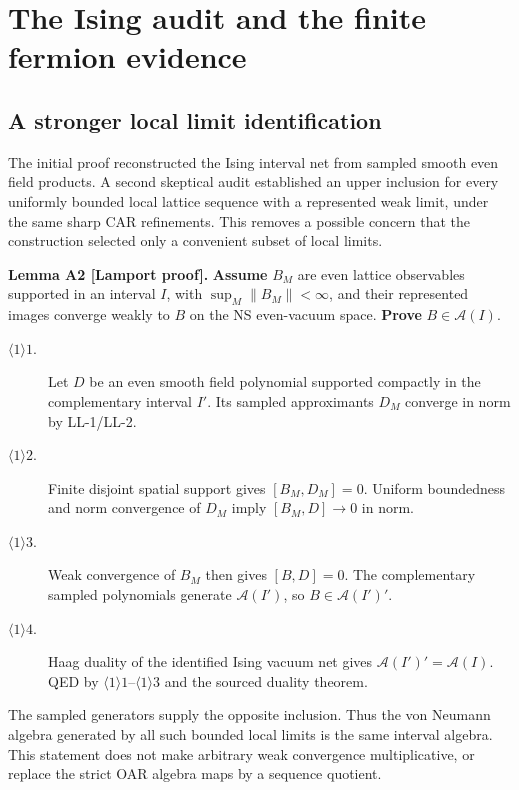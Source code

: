 \section{The Ising audit and the finite fermion evidence}

\subsection{A stronger local limit identification}

The initial proof reconstructed the Ising interval net from sampled smooth
even field products. A second skeptical audit established an upper inclusion
for every uniformly bounded local lattice sequence with a represented weak
limit, under the same sharp CAR refinements. This removes a possible concern
that the construction selected only a convenient subset of local limits.

\textbf{Lemma A2 [Lamport proof].}
\textbf{Assume} $B_M$ are even lattice observables supported in an interval
$I$, with $\sup_M\|B_M\|<\infty$, and their represented images converge
weakly to $B$ on the NS even-vacuum space. \textbf{Prove} $B\in\mathcal A(I)$.
\begin{description}
\item[$\langle1\rangle1$.] Let $D$ be an even smooth field polynomial
supported compactly in the complementary interval $I'$. Its sampled
approximants $D_M$ converge in norm by LL-1/LL-2.
\item[$\langle1\rangle2$.] Finite disjoint spatial support gives
$[B_M,D_M]=0$. Uniform boundedness and norm convergence of $D_M$ imply
$[B_M,D]\to0$ in norm.
\item[$\langle1\rangle3$.] Weak convergence of $B_M$ then gives
$[B,D]=0$. The complementary sampled polynomials generate
$\mathcal A(I')$, so $B\in\mathcal A(I')'$.
\item[$\langle1\rangle4$.] Haag duality of the identified Ising vacuum
net gives $\mathcal A(I')'=\mathcal A(I)$. QED by
$\langle1\rangle1$--$\langle1\rangle3$ and the sourced duality theorem.
\end{description}
The sampled generators supply the opposite inclusion. Thus the von Neumann
algebra generated by all such bounded local limits is the same interval
algebra. This statement does not make arbitrary weak convergence
multiplicative, or replace the strict OAR algebra maps by a sequence quotient.


